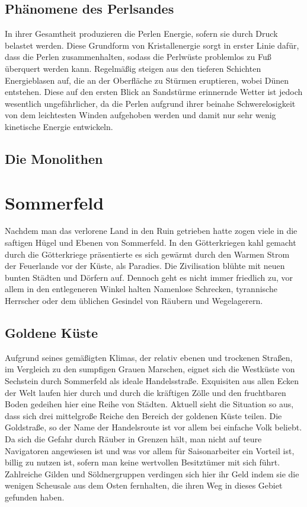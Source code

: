 \documentclass[a4paper,12pt,oneside]{book}
\begin{document}
\subsection{Phänomene des Perlsandes}
In ihrer Gesamtheit produzieren die Perlen Energie, sofern sie durch Druck belastet werden. Diese Grundform von Kristallenergie sorgt in erster Linie dafür, dass die Perlen zusammenhalten, sodass die Perlwüste problemlos zu Fuß überquert werden kann. Regelmäßig steigen aus den tieferen Schichten Energieblasen auf, die an der Oberfläche zu Stürmen eruptieren, wobei Dünen entstehen. Diese auf den ersten Blick an Sandstürme erinnernde Wetter ist jedoch wesentlich ungefährlicher, da die Perlen aufgrund ihrer beinahe Schwerelosigkeit von dem leichtesten Winden aufgehoben werden und damit nur sehr wenig kinetische Energie entwickeln.
\subsection{Die Monolithen}

\section{Sommerfeld}
Nachdem man das verlorene Land in den Ruin getrieben hatte zogen viele in die saftigen Hügel und Ebenen von Sommerfeld. In den Götterkriegen kahl gemacht durch die Götterkriege präsentierte es sich gewärmt durch den Warmen Strom der Feuerlande vor der Küste, als Paradies. Die Zivilisation blühte mit neuen bunten Städten und Dörfern auf. Dennoch geht es nicht immer friedlich zu, vor allem in den entlegeneren Winkel halten Namenlose Schrecken, tyrannische Herrscher oder dem üblichen Gesindel von Räubern und Wegelagerern.
\subsection{Goldene Küste}
Aufgrund seines gemäßigten Klimas, der relativ ebenen und trockenen Straßen, im Vergleich zu den sumpfigen Grauen Marschen, eignet sich die Westküste von Sechstein durch Sommerfeld als ideale Handelsstraße. Exquisiten aus allen Ecken der Welt laufen hier durch und durch die kräftigen Zölle und den fruchtbaren Boden gedeihen hier eine Reihe von Städten. Aktuell sieht die Situation so aus, dass sich drei mittelgroße Reiche den Bereich der goldenen Küste teilen. Die Goldstraße, so der Name der Handelsroute ist vor allem bei einfache Volk beliebt. Da sich die Gefahr durch Räuber in Grenzen hält, man nicht auf teure Navigatoren angewiesen ist und was vor allem für Saisonarbeiter ein Vorteil ist, billig zu nutzen ist, sofern man keine wertvollen Besitztümer mit sich führt. Zahlreiche Gilden und Söldnergruppen verdingen sich hier ihr Geld indem sie die wenigen Scheusale aus dem Osten fernhalten, die ihren Weg in dieses Gebiet gefunden haben.
\end{document}
